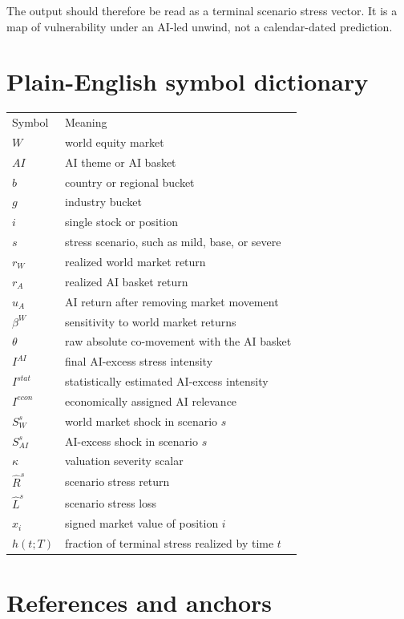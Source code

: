 \documentclass[10pt]{article}
\begin{document}
The output should therefore be read as a terminal scenario stress vector. It is a map of vulnerability under an AI-led unwind, not a calendar-dated prediction.

\newpage
\section*{Plain-English symbol dictionary}

\begin{center}
\begin{tabular}{ll}
Symbol & Meaning \\
$W$ & world equity market \\
$AI$ & AI theme or AI basket \\
$b$ & country or regional bucket \\
$g$ & industry bucket \\
$i$ & single stock or position \\
$s$ & stress scenario, such as mild, base, or severe \\
$r_W$ & realized world market return \\
$r_A$ & realized AI basket return \\
$u_A$ & AI return after removing market movement \\
$\beta^W$ & sensitivity to world market returns \\
$\theta$ & raw absolute co-movement with the AI basket \\
$I^{AI}$ & final AI-excess stress intensity \\
$I^{stat}$ & statistically estimated AI-excess intensity \\
$I^{econ}$ & economically assigned AI relevance \\
$S_W^s$ & world market shock in scenario $s$ \\
$S_{AI}^s$ & AI-excess shock in scenario $s$ \\
$\kappa$ & valuation severity scalar \\
$\widehat R^s$ & scenario stress return \\
$\widehat L^s$ & scenario stress loss \\
$x_i$ & signed market value of position $i$ \\
$h(t;T)$ & fraction of terminal stress realized by time $t$
\end{tabular}
\end{center}

\section*{References and anchors}
\end{document}
